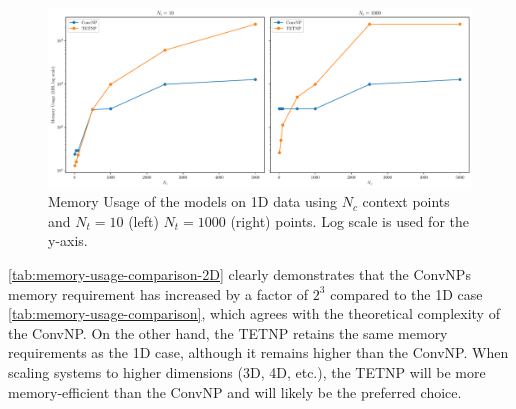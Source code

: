 \documentclass[../../main.tex]{subfiles}
\begin{document}

\begin{figure}[H]
	\centering
	\includegraphics[width=0.97\linewidth]{./fig/runtime2d.pdf}
	\caption{Memory Usage of the models on 1D data using $N_c$ context points and $N_t = 10$ (left) $N_t = 1000$ (right) points. Log scale is used for the y-axis.}
	\label{tab:memory-usage-comparison-2D}
\end{figure}

\autoref{tab:memory-usage-comparison-2D} clearly demonstrates that the ConvNPs memory requirement has increased by a factor of $2^3$ compared to the 1D case \autoref{tab:memory-usage-comparison}, which agrees with the theoretical complexity of the ConvNP. On the other hand, the TETNP retains the same memory requirements as the 1D case, although it remains higher than the ConvNP. When scaling systems to higher dimensions (3D, 4D, etc.), the TETNP will be more memory-efficient than the ConvNP and will likely be the preferred choice.
\end{document}
